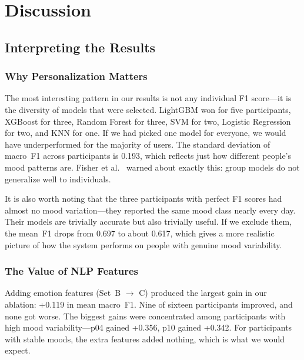 \documentclass[conference]{IEEEtran}
\begin{document}
\section{Discussion}
\label{sec:discussion}

\subsection{Interpreting the Results}

\subsubsection{Why Personalization Matters}

The most interesting pattern in our results is not any individual F1 score---it is the diversity of models that were selected. LightGBM won for five participants, XGBoost for three, Random Forest for three, SVM for two, Logistic Regression for two, and KNN for one. If we had picked one model for everyone, we would have underperformed for the majority of users. The standard deviation of macro~F1 across participants is 0.193, which reflects just how different people's mood patterns are. Fisher et al.~\cite{fisher2018} warned about exactly this: group models do not generalize well to individuals.

It is also worth noting that the three participants with perfect F1 scores had almost no mood variation---they reported the same mood class nearly every day. Their models are trivially accurate but also trivially useful. If we exclude them, the mean~F1 drops from 0.697 to about 0.617, which gives a more realistic picture of how the system performs on people with genuine mood variability.

\subsubsection{The Value of NLP Features}

Adding emotion features (Set~B $\rightarrow$ C) produced the largest gain in our ablation: +0.119 in mean macro~F1. Nine of sixteen participants improved, and none got worse. The biggest gains were concentrated among participants with high mood variability---p04 gained +0.356, p10 gained +0.342. For participants with stable moods, the extra features added nothing, which is what we would expect.
\end{document}
